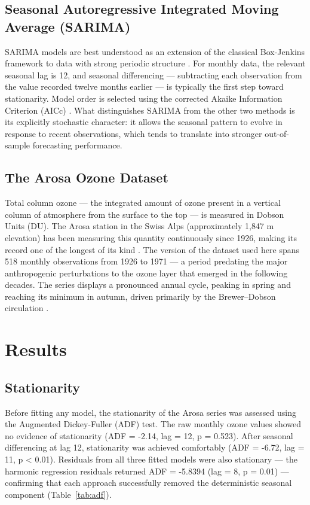 \documentclass[12pt,a4paper]{article}
\begin{document}
\subsection{Seasonal Autoregressive Integrated Moving Average (SARIMA)}
SARIMA models are best understood as an extension of the classical Box-Jenkins framework to data with strong periodic structure \cite{Box2015}. For monthly data, the relevant seasonal lag is 12, and seasonal differencing — subtracting each observation from the value recorded twelve months earlier — is typically the first step toward stationarity. Model order is selected using the corrected Akaike Information Criterion (AICc) \cite{Hyndman2021}. What distinguishes SARIMA from the other two methods is its explicitly stochastic character: it allows the seasonal pattern to evolve in response to recent observations, which tends to translate into stronger out-of-sample forecasting performance.

\subsection{The Arosa Ozone Dataset}
Total column ozone — the integrated amount of ozone present in a vertical column of atmosphere from the surface to the top — is measured in Dobson Units (DU). The Arosa station in the Swiss Alps (approximately 1,847 m elevation) has been measuring this quantity continuously since 1926, making its record one of the longest of its kind \cite{Shumway2017, Staehelin2001}. The version of the dataset used here spans 518 monthly observations from 1926 to 1971 — a period predating the major anthropogenic perturbations to the ozone layer that emerged in the following decades. The series displays a pronounced annual cycle, peaking in spring and reaching its minimum in autumn, driven primarily by the Brewer–Dobson circulation \cite{Staehelin2001}.

\section{Results}

\subsection{Stationarity}
Before fitting any model, the stationarity of the Arosa series was assessed using the Augmented Dickey-Fuller (ADF) test. The raw monthly ozone values showed no evidence of stationarity (ADF = -2.14, lag = 12, p = 0.523). After seasonal differencing at lag 12, stationarity was achieved comfortably (ADF = -6.72, lag = 11, p < 0.01). Residuals from all three fitted models were also stationary — the harmonic regression residuals returned ADF = -5.8394 (lag = 8, p = 0.01) — confirming that each approach successfully removed the deterministic seasonal component (Table~\ref{tab:adf}).
\end{document}
